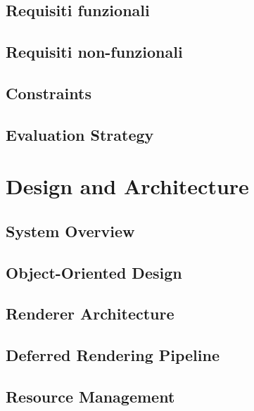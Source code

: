 \documentclass[12pt,a4paper,openright,twoside]{book}
\begin{document}
\section{Requisiti funzionali}

\section{Requisiti non-funzionali}

\section{Constraints}

\section{Evaluation Strategy}

\chapter{Design and Architecture}
\label{chap:design}

\section{System Overview}

\section{Object-Oriented Design}

\section{Renderer Architecture}

\section{Deferred Rendering Pipeline}

\section{Resource Management}

\end{document}
